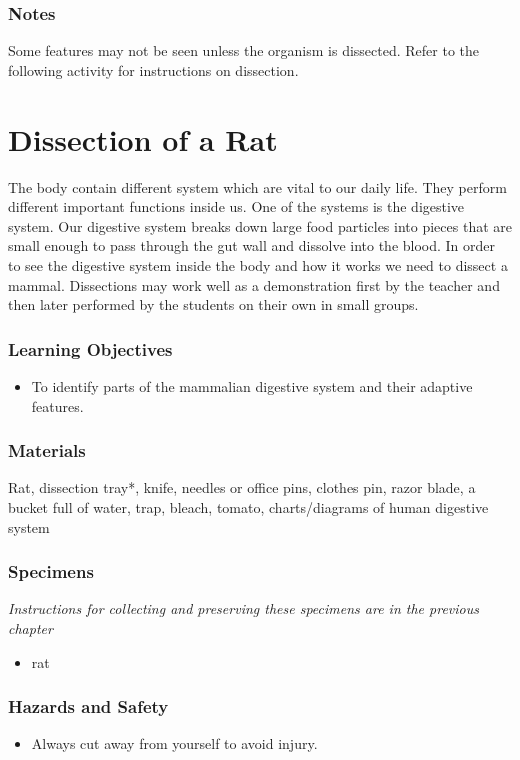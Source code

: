 \subsubsection*{Notes}
Some features may not be seen unless the organism is dissected.  Refer to the following activity for instructions on dissection.


\section{Dissection of a Rat}
The body contain different system which are vital to our daily life. They perform different important functions inside us. One of the systems is the digestive system. Our digestive system breaks down large food particles into pieces that are small enough to pass through the gut wall and dissolve into the blood. In order to see the digestive system inside the body and how it works we need to dissect a mammal.
Dissections may work well as a demonstration first by the teacher and then later performed by the students on their own in small groups.

\subsubsection*{Learning Objectives}
\begin{itemize}
\item{To identify parts of the mammalian digestive system and their adaptive features.}
\end{itemize}

\subsubsection*{Materials}
Rat, dissection tray*, knife, needles or office pins, clothes pin, razor blade, a bucket full of water, trap, bleach, tomato, charts/diagrams of human digestive system

\subsubsection*{Specimens}
\textit{Instructions for collecting and preserving these specimens are in the previous chapter}
\begin{itemize}
\item{rat}
\end{itemize}

\subsubsection*{Hazards and Safety}
\begin{itemize}
\item{Always cut away from yourself to avoid injury.}
\end{itemize}

